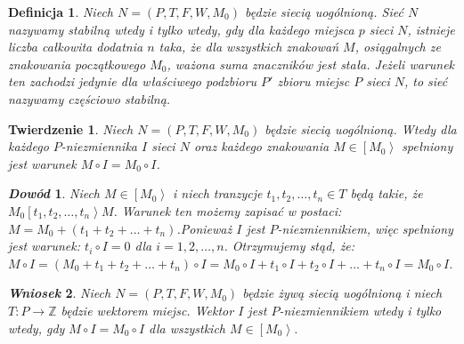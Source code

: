 \documentclass[a4paper,12pt]{book}
\newtheorem{df}{Definicja}
\newtheorem{tw}{Twierdzenie}
\newtheorem*{Dowód}{\textmd{\textit{Dowód}}}
\newtheorem{wns}[tw]{\textmd{\textit{Wniosek}}}
\begin{document}
     
\begin{df}
Niech $N=(P,T,F,W,M_0)$ będzie siecią uogólnioną. Sieć $N$ nazywamy \textit{stabilną} wtedy i tylko wtedy, gdy dla każdego miejsca $p$ sieci $N$, istnieje liczba całkowita dodatnia $n$ taka, że dla wszystkich znakowań $M$, osiągalnych ze znakowania początkowego $M_0$, ważona suma znaczników jest stała. Jeżeli warunek ten zachodzi jedynie dla właściwego podzbioru $P'$ zbioru miejsc $P$ sieci $N$, to sieć nazywamy częściowo stabilną.
\end{df}
\begin{tw}
Niech $N=(P,T,F,W,M_0)$ będzie siecią uogólnioną. Wtedy dla każdego $P$-niezmiennika $I$ sieci $N$ oraz każdego znakowania $M \in \left[M_0\right>$ spełniony jest warunek $M \circ I = M_0 \circ I$.  
\end{tw}
\begin{Dowód}
	Niech $M \in \left[M_0\right>$ i niech tranzycje $t_1,t_2,\dots,t_n \in T$ będą takie, że $M_0 \left[t_1,t_2,\dots,t_n\right> M$. Warunek ten możemy zapisać w postaci: $M = M_0 + (t_1+t_2+\dots+t_n)$.Ponieważ $I$ jest $P$-niezmiennikiem, więc spełniony jest warunek: $t_i \circ I = 0$ dla $i = 1,2,\dots,n$. Otrzymujemy stąd, że: $M \circ I = (M_0 + t_1+t_2+\dots+t_n) \circ I = M_0 \circ I + t_1 \circ I + t_2 \circ I + \dots + t_n \circ I = M_0 \circ I$.
\end{Dowód}

\begin{wns}
Niech $N=(P,T,F,W,M_0)$ będzie żywą siecią uogólnioną i niech $T \colon P \to \mathbb{Z}$ będzie wektorem miejsc. Wektor $I$ jest $P$-niezmiennikiem wtedy i tylko wtedy, gdy $M \circ I = M_0 \circ I$ dla wszystkich $M \in \left[M_0\right>$.
\end{wns}
\end{document}
